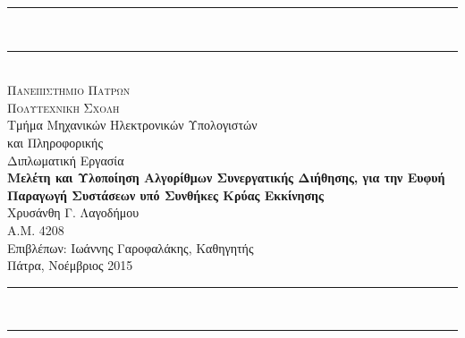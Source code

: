 \newcommand{\HRule}{\rule{\linewidth}{0.5mm}}
\newcommand{\Hrule}{\rule{\linewidth}{0.3mm}}


\begin{titlepage}
 
\begin{center}
\HRule \\ \vspace{-10pt}
\rule{10cm}{0.3mm}\\
\vspace{.4cm}
 \textsc{{\Large Πανεπιστημιο Πατρων}} \\
\vspace{.2cm}
\textsc{{\Large Πολυτεχνικη Σχολη}} \\
\vspace{.1cm}
{\large Τμήμα Μηχανικών Ηλεκτρονικών Υπολογιστών \\  και Πληροφορικής} \\
\vspace{3cm} 
{\large Διπλωματική Εργασία} \\
\vspace{2cm}
\textbf{{\Large \textsf{Μελέτη και Υλοποίηση Αλγορίθμων Συνεργατικής Διήθησης, για την Ευφυή Παραγωγή Συστάσεων υπό Συνθήκες Κρύας Εκκίνησης}}}\\
\vspace{2cm}
{\large Χρυσάνθη Γ. Λαγοδήμου} \\
\small{Α.Μ. 4208} \\
\vspace{2.5cm}
{\large Επιβλέπων: Ιωάννης Γαροφαλάκης, Καθηγητής}\\
\vspace{1cm}
{\normalsize{Πάτρα, Νοέμβριος 2015}} \\
\vspace{.2cm}
\rule{10cm}{0.3mm}\\ \vspace{-10pt}
\HRule 
\end{center}
\end{titlepage}
 
